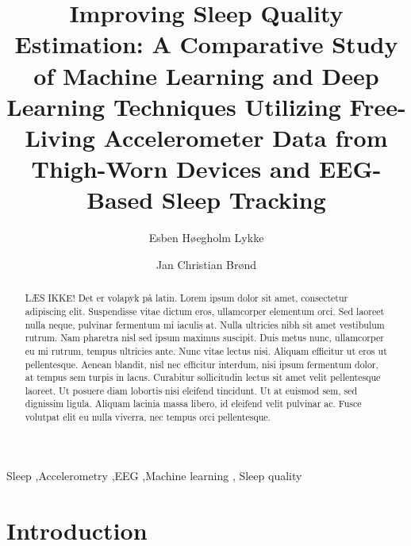 \documentclass[
  super,
  preprint,
  3p]{elsarticle}
\begin{document}
\begin{frontmatter}
\title{Improving Sleep Quality Estimation: A Comparative Study of
Machine Learning and Deep Learning Techniques Utilizing Free-Living
Accelerometer Data from Thigh-Worn Devices and EEG-Based Sleep Tracking}
\author[1]{Esben Høegholm Lykke%
%
}
\author[1]{Jan Christian Brønd%
%
}




        
\begin{abstract}
LÆS IKKE! Det er volapyk på latin. Lorem ipsum dolor sit amet,
consectetur adipiscing elit. Suspendisse vitae dictum eros, ullamcorper
elementum orci. Sed laoreet nulla neque, pulvinar fermentum mi iaculis
at. Nulla ultricies nibh sit amet vestibulum rutrum. Nam pharetra nisl
sed ipsum maximus suscipit. Duis metus nunc, ullamcorper eu mi rutrum,
tempus ultricies ante. Nunc vitae lectus nisi. Aliquam efficitur ut eros
ut pellentesque. Aenean blandit, nisl nec efficitur interdum, nisi ipsum
fermentum dolor, at tempus sem turpis in lacus. Curabitur sollicitudin
lectus sit amet velit pellentesque laoreet. Ut posuere diam lobortis
nisi eleifend tincidunt. Ut at euismod sem, sed dignissim ligula.
Aliquam lacinia massa libero, id eleifend velit pulvinar ac. Fusce
volutpat elit eu nulla viverra, nec tempus orci pellentesque.
\end{abstract}





\begin{keyword}
    Sleep \sep Accelerometry \sep EEG \sep Machine learning \sep 
    Sleep quality
\end{keyword}
\end{frontmatter}
    \ifdefined\Shaded\renewenvironment{Shaded}{\begin{tcolorbox}[breakable, borderline west={3pt}{0pt}{shadecolor}, boxrule=0pt, frame hidden, enhanced, sharp corners, interior hidden]}{\end{tcolorbox}}\fi

\hypertarget{introduction}{%
\section{Introduction}\label{introduction}}
\end{document}
